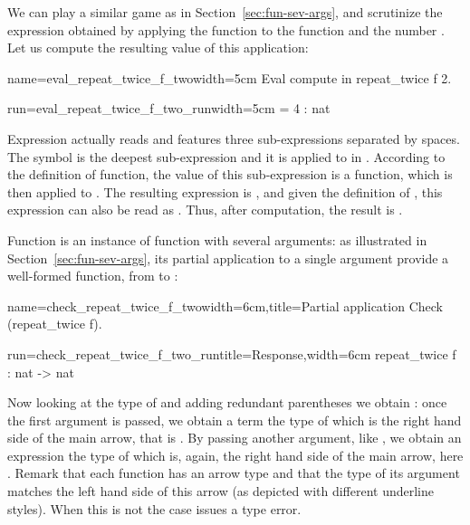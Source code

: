 We can play a similar game as in Section~\ref{sec:fun-sev-args},
and scrutinize the expression obtained by applying the
function  to  the function
 and the number . Let us compute the resulting value of this
application:

\begin{coq}{name=eval_repeat_twice_f_two}{width=5cm}
Eval compute in repeat_twice f 2.
\end{coq}
\begin{coqout}{run=eval_repeat_twice_f_two_run}{width=5cm}
= 4 : nat
\end{coqout}

Expression  actually reads
 and features three sub-expressions separated by
spaces. The symbol  is the deepest
sub-expression and it is applied to  in .
According to the definition of  function, the value of
this sub-expression is a function, which is then applied to .
The resulting expression is , and given the
definition of , this expression can also
be read as .  Thus, after computation, the result is .

Function   is an instance of function with several
arguments: as illustrated in Section~\ref{sec:fun-sev-args}, its
partial application to a single argument provide a well-formed
function, from  to :

\begin{coq}{name=check_repeat_twice_f_two}{width=6cm,title=Partial application}
Check (repeat_twice f).
\end{coq}
\begin{coqout}{run=check_repeat_twice_f_two_run}{title=Response,width=6cm}
repeat_twice f : nat -> nat
\end{coqout}

Now looking at the type of  and adding redundant parentheses
we obtain :
once the first argument
 is passed, we obtain a term the type of which is
the right hand side of the main arrow, that is .
By passing another argument, like , we obtain an expression
the type of which is, again, the right hand side of the main arrow,
here .
Remark that each function has an arrow type and that the type of its
argument matches the left hand side of this arrow (as depicted with
different underline styles). When this is not the case \Coq{} issues a
type error.


